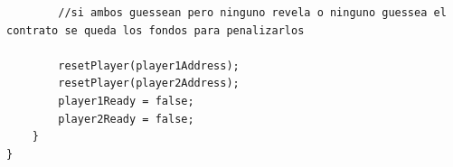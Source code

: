\documentclass[12pt,addpoints,answers]{exam}
\begin{document}
\begin{questions}
\begin{parts}
\begin{verbatim}
        //si ambos guessean pero ninguno revela o ninguno guessea el contrato se queda los fondos para penalizarlos

        resetPlayer(player1Address);
        resetPlayer(player2Address);
        player1Ready = false;
        player2Ready = false;
    }
}

\end{verbatim}

\end{parts}

\newpage

~\\

\end{questions}
\end{document}
